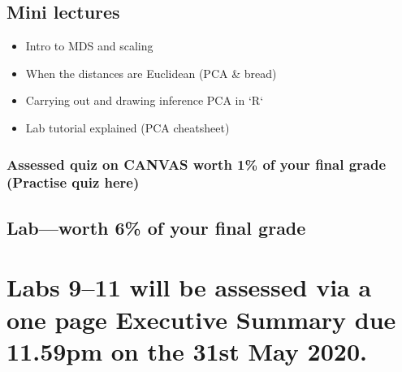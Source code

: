 \documentclass{article}
\begin{document}
\subsection*{Mini lectures}

\begin{itemize}
\item Intro to MDS and scaling
\item When the distances are Euclidean (PCA \& bread)
\item Carrying out and drawing inference PCA in `R`
\item Lab tutorial explained (PCA cheatsheet)
\end{itemize}

\subsubsection*{Assessed quiz on CANVAS worth 1\% of your final grade (Practise quiz here)}

\subsection*{Lab---worth 6\% of your final grade}

\newpage

\section*{Labs 9--11 will be assessed via a one page Executive Summary due 11.59pm on the 31st May 2020.}
\end{document}
